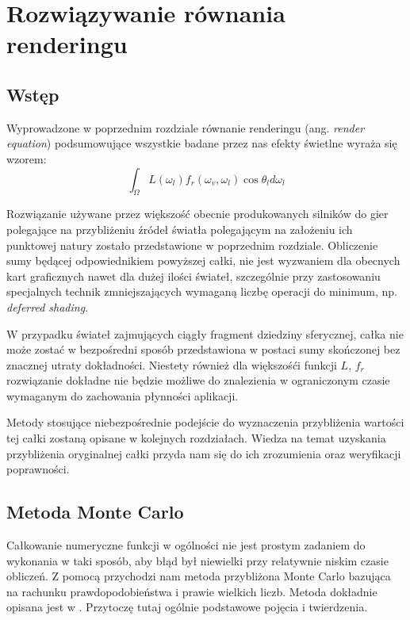 \documentclass[../main.tex]{subfiles}
\begin{document}
\chapter{Rozwiązywanie równania renderingu}

\section{Wstęp}

Wyprowadzone w poprzednim rozdziale równanie renderingu (ang. \textit{render equation}) podsumowujące wszystkie badane przez nas efekty świetlne wyraża się wzorem:
\[
  \int_{\Omega} {
    L(\omega_{l})
    f_r(\omega_{v}, \omega_{l})
    \cos \theta_{l}
    d\omega_{l}
  }
\]

Rozwiązanie używane przez większość obecnie produkowanych silników do gier polegające na przybliżeniu źródeł światła polegającym na założeniu ich punktowej natury zostało przedstawione w poprzednim rozdziale. Obliczenie sumy będącej odpowiednikiem powyższej całki, nie jest wyzwaniem dla obecnych kart graficznych nawet dla dużej ilości świateł, szczególnie przy zastosowaniu specjalnych technik zmniejszających wymaganą liczbę operacji do minimum, np. \textit{deferred shading}.  

W przypadku świateł zajmujących ciągły fragment dziedziny sferycznej, całka nie może zostać w bezpośredni sposób przedstawiona w postaci sumy skończonej bez znacznej utraty dokładności. Niestety również dla większośći funkcji $L$, $f_r$ rozwiązanie dokładne nie będzie możliwe do znalezienia w ograniczonym czasie wymaganym do zachowania płynności aplikacji.

Metody stosujące niebezpośrednie podejście do wyznaczenia przybliżenia wartości tej całki zostaną opisane w kolejnych rozdziałach. Wiedza na temat uzyskania przybliżenia oryginalnej całki przyda nam się do ich zrozumienia oraz weryfikacji poprawności.

\section{Metoda Monte Carlo}

Całkowanie numeryczne funkcji w ogólności nie jest prostym zadaniem do wykonania w taki sposób, aby błąd był niewielki przy relatywnie niskim czasie obliczeń. Z pomocą przychodzi nam metoda przybliżona Monte Carlo bazująca na rachunku prawdopodobieństwa i prawie wielkich liczb. Metoda dokładnie opisana jest w \cite{Sierocinski,MonteCarloAnderson,Veach}. Przytoczę tutaj ogólnie podstawowe pojęcia i twierdzenia.
\end{document}
